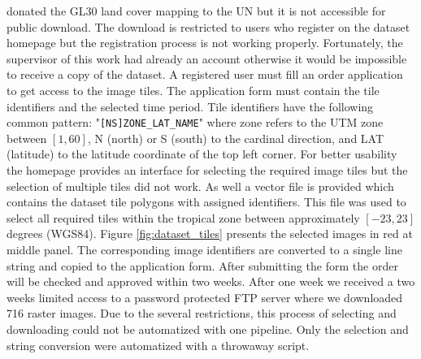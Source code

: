 		\citeauthor{Chen2015} donated the \ac{GL30} land cover mapping to the \ac{UN} but it is not accessible for public download. The download is restricted to users who register on the dataset homepage but the registration process is not working properly. Fortunately, the supervisor of this work had already an account otherwise it would be impossible to receive a copy of the dataset. A registered user must fill an order application to get access to the image tiles. The application form must contain the tile identifiers and the selected time period. Tile identifiers have the following common pattern: "\verb|[NS]ZONE_LAT_NAME|" where zone refers to the \ac{UTM} zone between $[1, 60]$, N (north) or S (south) to the cardinal direction, and LAT (latitude) to the latitude coordinate of the top left corner. For better usability the homepage provides an interface for selecting the required image tiles but the selection of multiple tiles did not work. As well a vector file is provided which contains the dataset tile polygons with assigned identifiers. This file was used to select all required tiles within the tropical zone between approximately $[-23, 23]$ degrees (\ac{WGS84}). Figure \ref{fig:dataset_tiles} presents the selected images in red at middle panel. The corresponding image identifiers are converted to a single line string and copied to the application form. After submitting the form the order will be checked and approved within two weeks. After one week we received a two weeks limited access to a password protected \ac{FTP} server where we downloaded 716 raster images. Due to the several restrictions, this process of selecting and downloading could not be automatized with one pipeline. Only the selection and string conversion were automatized with a throwaway script.
